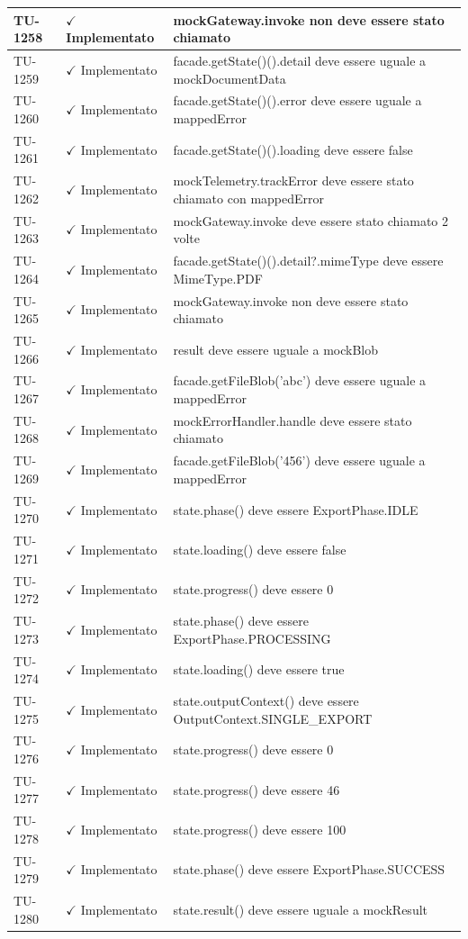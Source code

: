﻿\documentclass[a4paper,12pt]{article}
\newcommand{\ok}{\textcolor{green!60!black}{$\checkmark$ Implementato}}
\begin{document}
\begin{longtable}{|p{2cm}|p{3.5cm}|p{9.5cm}|}
\hline
TU-1258 & \ok & mockGateway.invoke non deve essere stato chiamato \\
\hline
TU-1259 & \ok & facade.getState()().detail deve essere uguale a mockDocumentData \\
\hline
TU-1260 & \ok & facade.getState()().error deve essere uguale a mappedError \\
\hline
TU-1261 & \ok & facade.getState()().loading deve essere false \\
\hline
TU-1262 & \ok & mockTelemetry.trackError deve essere stato chiamato con mappedError \\
\hline
TU-1263 & \ok & mockGateway.invoke deve essere stato chiamato 2 volte \\
\hline
TU-1264 & \ok & facade.getState()().detail?.mimeType deve essere MimeType.PDF \\
\hline
TU-1265 & \ok & mockGateway.invoke non deve essere stato chiamato \\
\hline
TU-1266 & \ok & result deve essere uguale a mockBlob \\
\hline
TU-1267 & \ok & facade.getFileBlob('abc') deve essere uguale a mappedError \\
\hline
TU-1268 & \ok & mockErrorHandler.handle deve essere stato chiamato \\
\hline
TU-1269 & \ok & facade.getFileBlob('456') deve essere uguale a mappedError \\
\hline
TU-1270 & \ok & state.phase() deve essere ExportPhase.IDLE \\
\hline
TU-1271 & \ok & state.loading() deve essere false \\
\hline
TU-1272 & \ok & state.progress() deve essere 0 \\
\hline
TU-1273 & \ok & state.phase() deve essere ExportPhase.PROCESSING \\
\hline
TU-1274 & \ok & state.loading() deve essere true \\
\hline
TU-1275 & \ok & state.outputContext() deve essere OutputContext.SINGLE\_EXPORT \\
\hline
TU-1276 & \ok & state.progress() deve essere 0 \\
\hline
TU-1277 & \ok & state.progress() deve essere 46 \\
\hline
TU-1278 & \ok & state.progress() deve essere 100 \\
\hline
TU-1279 & \ok & state.phase() deve essere ExportPhase.SUCCESS \\
\hline
TU-1280 & \ok & state.result() deve essere uguale a mockResult \\

\end{longtable}
\end{document}
